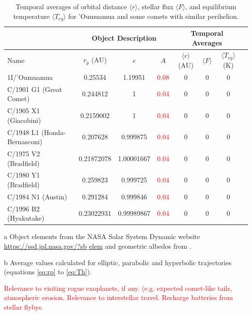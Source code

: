 \documentclass[a4paper,fleqn,usenatbib]{mnras}
\newcommand{\fix}{\textcolor{red}}
\begin{document}
\begin{table}
\begin{threeparttable}
\centering
\caption{Temporal averages of orbital distance $\langle r \rangle$, stellar flux $\langle F \rangle$, and equilibrium temperature $\langle T_{eq} \rangle$ for 'Oumuamua and some comets with similar perihelion.}
\begin{tabular}{ l c c c c | c c c }
 \hline
 \hline
 & \multicolumn{3}{c}{Object Description\tnote{a}} & \multicolumn{3}{c}{Temporal Averages\tnote{b}} \\
 \hline
 Name & $r_p$ (AU) & $e$ & $A$ &
 	$\langle r \rangle$ (AU) & $\langle F \rangle$ & $\langle T_{eq} \rangle$ (K) \\ 
 \hline
 1I/'Oumuamua & 0.25534 & 1.19951 & \fix{0.08} & 0  & 0 & 0 \\
 C/1901 G1 (Great Comet) & 0.244812 & 1 & \fix{0.04} & 0  & 0 & 0 \\
 C/1905 X1 (Giacobini) & 0.2159002 & 1 & \fix{0.04} & 0  & 0 & 0 \\
C/1948 L1 (Honda-Bernasconi) & 0.207628 & 0.999875 & \fix{0.04} & 0  & 0 & 0 \\
 C/1975 V2 (Bradfield) & 0.21872078 & 1.00001667 & \fix{0.04} & 0  & 0 & 0 \\
 C/1980 Y1 (Bradfield) & 0.259823 & 0.999725 & \fix{0.04} & 0  & 0 & 0 \\
 C/1984 N1 (Austin) & 0.291284 & 0.999846 & \fix{0.04} & 0  & 0 & 0 \\
 C/1996 B2 (Hyakutake) & 0.23022931	& 0.99989867 & \fix{0.04} & 0  & 0 & 0 \\
 \hline
 \hline
\end{tabular}
\label{tab:escape}
	\begin{tablenotes}
	\small
\item[a]{Object elements from the NASA Solar System Dynamic website \href{https://ssd.jpl.nasa.gov/?sb$\_$elem}{https://ssd.jpl.nasa.gov/?sb$\_$elem} and geometric albedos from \citep{2004come.book..223L}.}
\item[b]{Average values calculated for elliptic, parabolic and hyperbolic trajectories (equations \ref{eq:rp} to \ref{eq:Th}).}
	\end{tablenotes}
\end{threeparttable}
\end{table}

\fix{Relevance to visiting rogue exoplanets, if any. (e.g. expected comet-like tails, atmospheric erosion. Relevance to interstellar travel. Recharge batteries from stellar flybys.}
\end{document}
